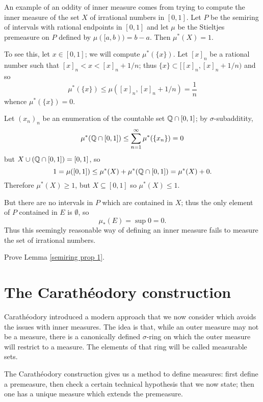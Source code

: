 \begin{example}
An example of an oddity of inner measure comes from trying to compute the inner measure of the set $X$ of irrational numbers in $[0, 1]$.
Let $P$ be the semiring of intervals with rational endpoints in $[0, 1]$ and let $\mu$ be the Stieltjes premeasure on $P$ defined by $\mu([a, b)) = b - a$.
Then $\mu^*(X) = 1$.

To see this, let $x \in [0, 1]$; we will compute $\mu^*(\{x\})$. Let $[x]_{n}$ be a rational number such that $[x]_{n} < x < [x]_{n} + 1/n$; thus $\{x\} \subset [[x]_{n}, [x]_{n} + 1/n)$ and so
\[\mu^*(\{x\}) \leq \mu([x]_{n}, [x]_{n} + 1/n) = \frac{1}{n}\]
whence $\mu^*(\{x\}) = 0$.

Let $(x_{n})_{n}$ be an enumeration of the countable set $\mathbb{Q} \cap [0, 1]$; by $\sigma$-subadditity,
\[\mu^*(\mathbb{Q} \cap [0, 1]) \leq \sum_{n=1}^{\infty} \mu^*(\{x_{n}\}) = 0\]
but $X \cup (\mathbb{Q} \cap [0, 1]) = [0, 1]$, so
\[1 = \mu([0, 1]) \leq \mu^*(X) + \mu^*(\mathbb{Q} \cap [0, 1]) = \mu^*(X) + 0.\]
Therefore $\mu^*(X) \geq 1$, but $X \subseteq [0, 1]$ so $\mu^*(X) \leq 1$.

But there are no intervals in $P$ which are contained in $X$; thus the only element of $P$ contained in $E$ is $\emptyset$, so
\[\mu_*(E) = \sup 0 = 0.\]
Thus this seemingly reasonable way of defining an inner measure fails to measure the set of irrational numbers.
\end{example}

\begin{exercise}
\label{semiring exercise}
Prove Lemma \ref{semiring prop 1}.
\end{exercise}


\section{The Carathéodory construction}
Carathéodory introduced a modern approach that we now consider which avoids the issues with inner measures.
The idea is that, while an outer measure may not be a measure, there is a canonically defined $\sigma$-ring on which the outer measure will restrict to a measure.
The elements of that ring will be called measurable sets.

\begin{subsec}
The Carathéodory construction gives us a method to define measures: first define a premeasure, then check a certain technical hypothesis that we now state; then one has a unique measure which extends the premeasure.
\end{subsec}

